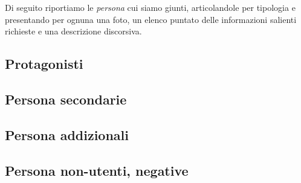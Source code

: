 \noindent
Di seguito riportiamo le \textit{persona} cui siamo giunti, articolandole per tipologia e presentando per ognuna una foto, un elenco puntato delle informazioni salienti richieste e una descrizione discorsiva.

\clearpage
\subsection{Protagonisti}
\label{ss:protagonisti}


\clearpage




\subsection{Persona secondarie}
\label{ss:persona-secondaria}



\subsection{Persona addizionali}
\label{ss:persona-addizional}



\subsection{Persona non-utenti, negative}
\label{ss:persona-negative}


